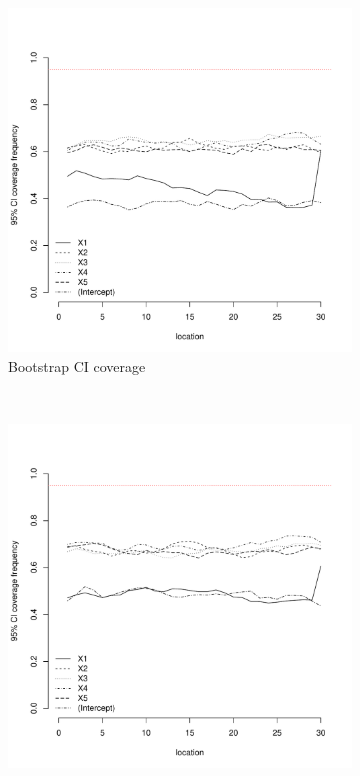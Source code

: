 \documentclass[authoryear, review, 11pt]{elsarticle}
\begin{document}
\begin{figure}
	\vspace{-30mm}
	\centering
	\begin{subfigure}[b]{0.45\textwidth}
	\centering
		\includegraphics[width=\textwidth]{../../figures/simulation/15.30.profile_bootstrap_coverage.pdf}
		\caption{Bootstrap CI coverage}
	\end{subfigure}%
	~ %
	\begin{subfigure}[b]{0.45\textwidth}
	\centering
		\includegraphics[width=\textwidth]{../../figures/simulation/15.30.profile_se_coverage.pdf}

\end{subfigure}
\end{figure}
\end{document}
